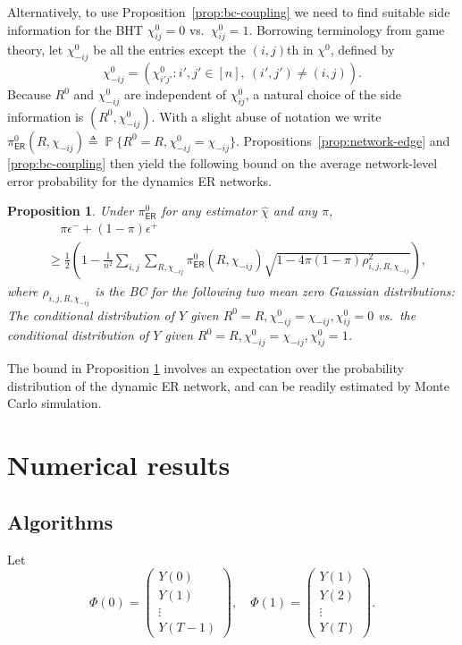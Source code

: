 \documentclass[conference,letterpaper]{IEEEtran}
\newcommand{\defeq}{\triangleq}
\renewcommand{\Pr}{\operatorname{\mathbb P}}%
\newtheorem{prop}{Proposition}
\newcommand{\erPrior}{\pi^0_{\mathsf{ER}}}%
\newcommand{\fnrNet}{\epsilon^-}%
\newcommand{\fprNet}{\epsilon^+}%
\newcommand{\trueSuppMat}{\chi^0}%
\newcommand{\suppMat}{\chi}%
\newcommand{\suppMatEst}{\widehat\chi}%
\begin{document}
Alternatively, to use Proposition~\ref{prop:bc-coupling} we need to
find suitable side information for the BHT $\trueSuppMat_{ij} = 0$
vs.\ $\trueSuppMat_{ij} = 1$.  Borrowing terminology from game theory,
let $\trueSuppMat_{-ij}$ be all the entries except the $(i, j)$th in
$\trueSuppMat$, defined by
\[\trueSuppMat_{-ij}= (\trueSuppMat_{i'j'}: i',j' \in [n], ~(i',j')\neq (i,j)).\]
Because $R^0$ and $\trueSuppMat_{-ij}$ are independent of
$\trueSuppMat_{ij}$, a natural choice of the side information is
$(R^0, \trueSuppMat_{-ij})$.  With a slight abuse of notation we write
$\erPrior(R, \suppMat_{-ij}) \defeq\Pr\{R^0 = R, \trueSuppMat_{-ij} =
\suppMat_{-ij}\}$. Propositions~\ref{prop:network-edge} and
\ref{prop:bc-coupling} then yield the following bound on the average
network-level error probability for the dynamics ER networks.\\[-1em]
\begin{prop}
  \label{prop:er}
  Under $\erPrior$ for any estimator $\suppMatEst$ and any $\pi$,
  {\footnotesize
    \begin{align*}
      & \quad\pi\fnrNet + (1-\pi)\fprNet\\
      & \ge \frac 12\left(1 - \frac
        1{n^2}\sum_{i, j}\sum_{R, \suppMat_{-ij}}\erPrior(R, \suppMat_{-ij})\sqrt{1 -
        4\pi(1-\pi)\rho_{i, j, R, \suppMat_{-ij}}^2}\right),
    \end{align*}
  }%
  where $\rho_{i, j, R, \suppMat_{-ij}}$ is the BC for the following
  two mean zero Gaussian distributions: The conditional distribution
  of $Y$ given
  $R^0 = R, \trueSuppMat_{-ij} = \suppMat_{-ij}, \trueSuppMat_{ij} =
  0$ vs.\ the conditional distribution of $Y$ given
  $R^0 = R, \trueSuppMat_{-ij} = \suppMat_{-ij}, \trueSuppMat_{ij} =
  1$.
\end{prop}
The bound in Proposition \ref{prop:er} involves an expectation over
the probability distribution of the dynamic ER network, and can be
readily estimated by Monte Carlo simulation.
\section{Numerical results}
\label{sec:num}
\subsection{Algorithms}
Let
\[\Phi(0) =
  \begin{pmatrix}
    Y(0)\\Y(1)\\\vdots\\Y(T-1)
  \end{pmatrix},\quad \Phi(1) =
  \begin{pmatrix}
    Y(1)\\Y(2)\\\vdots\\Y(T)
  \end{pmatrix}.
\]
\end{document}
